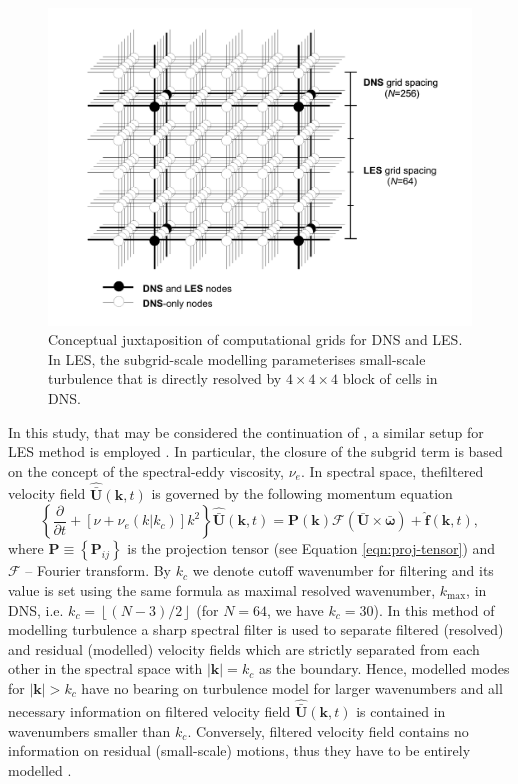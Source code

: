 \documentclass{pracamgren}
\begin{document}
\begin{figure}[h]
\centering
\includegraphics[width=17cm]{figures/1-02_dns-les-grids.pdf}
\caption{
Conceptual juxtaposition of computational grids for DNS and LES.
In LES, the subgrid-scale modelling parameterises small-scale turbulence that is directly resolved by $4 \times 4 \times 4$ block of cells in DNS.
}
\label{fig:dns-les-grids}
\end{figure}

In this study, that may be considered the continuation of \textcite{Rosa2017}, a similar setup for LES method is employed \parencite[based on earlier work by][]{Jin2010}.
In particular, the closure of the subgrid term is based on the concept of the spectral-eddy viscosity, $\nu_{e}$.
In spectral space, thefiltered velocity field $\hat{\bar{\mathbf{U}}}(\mathbf{k}, t)$ is governed by the following momentum equation \parencite{Pope2000}
\begin{equation}
\left\lbrace \frac{\partial}{\partial t} + [\nu + \nu_{e}(k|k_{c})]k^{2} \right\rbrace \hat{\bar{\mathbf{U}}}(\mathbf{k}, t) = \mathbf{P}(\mathbf{k}) \mathcal{F}(\bar{\mathbf{U}} \times \bar{\boldsymbol{\omega}}) + \hat{\mathbf{f}}(\mathbf{k}, t) ,
\label{eqn:les}
\end{equation}
where $\mathbf{P} \equiv \left\{ \mathbf{P}_{ij} \right\}$ is the projection tensor (see Equation \ref{eqn:proj-tensor}) and $\mathcal{F}$ -- Fourier transform.
By $k_{c}$ we denote cutoff wavenumber for filtering and its value is set using the same formula as maximal resolved wavenumber, $k_{\max}$, in DNS, i.e. $k_c = \left\lfloor (N - 3) / 2 \right\rfloor$ (for $N=64$, we have $k_c = 30$).
In this method of modelling turbulence a sharp spectral filter is used to separate filtered (resolved) and residual (modelled) velocity fields which are strictly separated from each other in the spectral space with $| \mathbf{k} | = k_c$ as the boundary.
Hence, modelled modes for $| \mathbf{k} | > k_c$ have no bearing on turbulence model for larger wavenumbers and all necessary information on filtered velocity field $\mathbf{\hat{\bar{U}}}(\mathbf{k}, t)$ is contained in wavenumbers smaller than $k_c$.
Conversely, filtered velocity field contains no information on residual (small-scale) motions, thus they have to be entirely modelled \parencite[p. 615]{Pope2000}.
\end{document}
